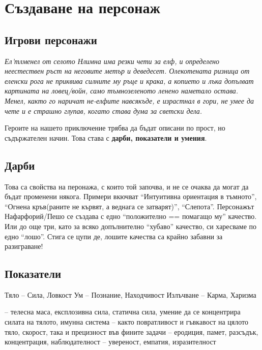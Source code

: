 \section{Създаване на персонаж}
\subsection{Игрови персонажи}
\emph{Ел'тлменел от селото Нлимна има резки чети за елф, и определено неестествен ръст на неговите метър и деведесет. Олекотената ризница от еленски рога не приквива силните му ръце и крака, а копието и лъка допълват картината на ловец/войн, само тъмнозеленото ленено наметало остава. Менел, както го наричат не-елфите навсякъде, е израстнал в гори, не умее да чете и е страшно глупав, когато става дума за светски дела.}

Героите на нашето приключение трябва да бъдат описани по прост, но съдържателен начин. Това става с {\bf дарби, показатели и умения}.

\subsection{Дарби}
Това са свойства на перонажа, с които той започва, и не се очаква да могат да бъдат променени някога. Примери вкючват “Интуитивна ориентация в тъмното”, “Огнена кръв(раните не кървят, а веднага се затварят)”, “Слепота”. Персонажът Нафарфорий/Пешо се създава с едно “положително == помагащо му” качество. Или до още три, като за всяко допълнително “хубаво” качество, си харесваме по едно “лошо”. Стига се цупи де, лошите качества са крайно забавни за разиграване!

\subsection{Показатели}
Тяло – Сила, Ловкост
Ум – Познание, Находчивост
Излъчване – Карма, Харизма

{} – телесна маса, експлозивна сила, статична сила, умение да се концентрира силата на тялото, имунна система
{} – както повратливост и гъвкавост на цялото тяло, скорост, така и прецизност във фините задачи
{} – еродиция, памет, разсъдък, концентрация, наблюдателност
{} – увереност, емпатия, изразителност

